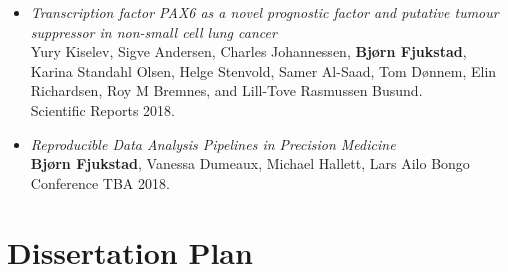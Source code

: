 \begin{itemize}
    \item \emph{Transcription factor PAX6 as a novel prognostic factor and
        putative tumour suppressor in non-small cell lung cancer} 
        \\
        Yury Kiselev, Sigve Andersen, Charles Johannessen, \textbf{Bjørn
        Fjukstad}, Karina Standahl Olsen, Helge Stenvold, Samer Al-Saad, Tom
        Dønnem, Elin Richardsen, Roy M Bremnes, and Lill-Tove Rasmussen Busund. 
        \\
        Scientific Reports 2018. 

    \item \emph{Reproducible Data Analysis Pipelines in Precision Medicine}
        \\
        \textbf{Bjørn Fjukstad}, Vanessa Dumeaux, Michael Hallett, Lars Ailo
        Bongo
        \\
        Conference TBA 2018. 
        
\end{itemize} 




\section{Dissertation Plan} 



